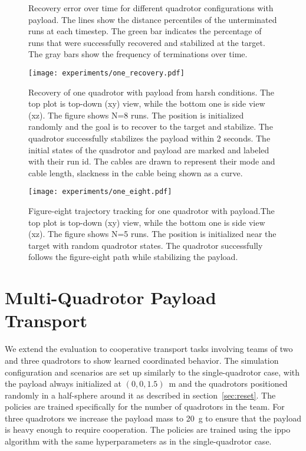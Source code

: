 \begin{figure}[H]
  \caption[Recovery error comparison]{Recovery error over time for different quadrotor configurations with payload. The lines show the distance percentiles of the unterminated runs at each timestep. The green bar indicates the percentage of runs that were successfully recovered and stabilized at the target. The gray bars show the frequency of terminations over time.}
  \label{fig:single_quad_payload_subfigs}
\end{figure}



\begin{figure}[H]
    \centering
    
    \texttt{[image: experiments/one\_recovery.pdf]}
    \caption[Single quadrotor harsh recovery trajectory]{Recovery of one quadrotor with payload from harsh conditions. The top plot is top-down  (xy) view, while the bottom one is side view (xz).
    The figure shows N=8 runs. The position is initialized randomly and the goal is to recover to the target and stabilize. The quadrotor successfully stabilizes the payload within 2 seconds. The initial states of the quadrotor and payload are marked and labeled with their run id. The cables are drawn to represent their mode and cable length, slackness in the cable being shown as a curve.}
    \label{fig:one_recovery}
\end{figure}
\begin{figure}[H]
    \centering
    
    \texttt{[image: experiments/one\_eight.pdf]}
    \caption[Single quadrotor figure-eight tracking]{Figure-eight trajectory tracking for one quadrotor with payload.The top plot is top-down  (xy) view, while the bottom one is side view (xz). The figure shows N=5 runs. The position is initialized near the target with random quadrotor states. The quadrotor successfully follows the figure-eight path while stabilizing the payload.}
    \label{fig:one_eight}
\end{figure}

\section{Multi-Quadrotor Payload Transport}
We extend the evaluation to cooperative transport tasks involving teams of two and three quadrotors to show learned coordinated behavior. The simulation configuration and scenarios are set up similarly to the single-quadrotor case, with the payload always initialized at $(0,0,1.5)$~m and the quadrotors positioned randomly in a half-sphere around it as described in section~\ref{sec:reset}. The policies are trained specifically for the number of quadrotors in the team. For three quadrotors we increase the payload mass to 20~g to ensure that the payload is heavy enough to require cooperation. The policies are trained using the \gls{ippo} algorithm with the same hyperparameters as in the single-quadrotor case.

